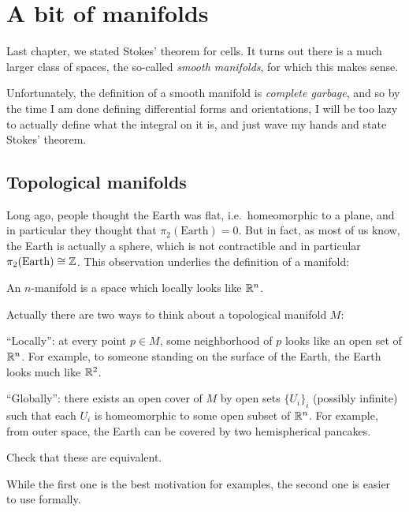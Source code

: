 \chapter{A bit of manifolds}
Last chapter, we stated Stokes' theorem for cells.
It turns out there is a much larger class of spaces,
the so-called \emph{smooth manifolds}, for which this makes sense.

Unfortunately, the definition of a smooth manifold is \emph{complete garbage},
and so by the time I am done defining differential forms and orientations,
I will be too lazy to actually define what the integral on it is,
and just wave my hands and state Stokes' theorem.

\section{Topological manifolds}

Long ago, people thought the Earth was flat,
i.e.\ homeomorphic to a plane, and in particular they thought that
$\pi_2(\text{Earth}) = 0$.
But in fact, as most of us know, the Earth is actually a sphere,
which is not contractible and in particular $\pi_2(\text{Earth}) \cong \mathbb Z$.
This observation underlies the definition of a manifold:
\begin{moral}
	An $n$-manifold is a space which locally looks like $\mathbb R^n$.
\end{moral}
Actually there are two ways to think about a topological manifold $M$:
\begin{itemize}
	\ii ``Locally'': at every point $p \in M$,
	some neighborhood of $p$ looks like an open set of $\mathbb R^n$.
	For example, to someone standing on the surface of the Earth,
	the Earth looks much like $\mathbb R^2$.
	
	\ii ``Globally'': there exists an open cover of $M$
	by open sets $\{U_i\}_i$ (possibly infinite) such that each $U_i$
	is homeomorphic to some open subset of $\mathbb R^n$.
	For example, from outer space, the Earth can be covered
	by two hemispherical pancakes.
\end{itemize}
\begin{ques}
	Check that these are equivalent.
\end{ques}
While the first one is the best motivation for examples,
the second one is easier to use formally.

